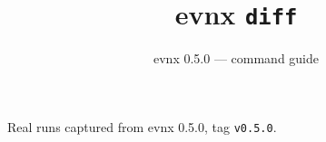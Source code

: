\documentclass[aspectratio=169,10pt]{beamer}
\title{evnx \texttt{diff}}
\subtitle{evnx 0.5.0 — command guide}
\date{}
\begin{document}
\begin{frame}[plain]\titlepage
  \begin{center}\footnotesize
  \textcolor{evnxMuted}{Real runs captured from evnx 0.5.0, tag \texttt{v0.5.0}.}
  \end{center}
\end{frame}

\end{document}
